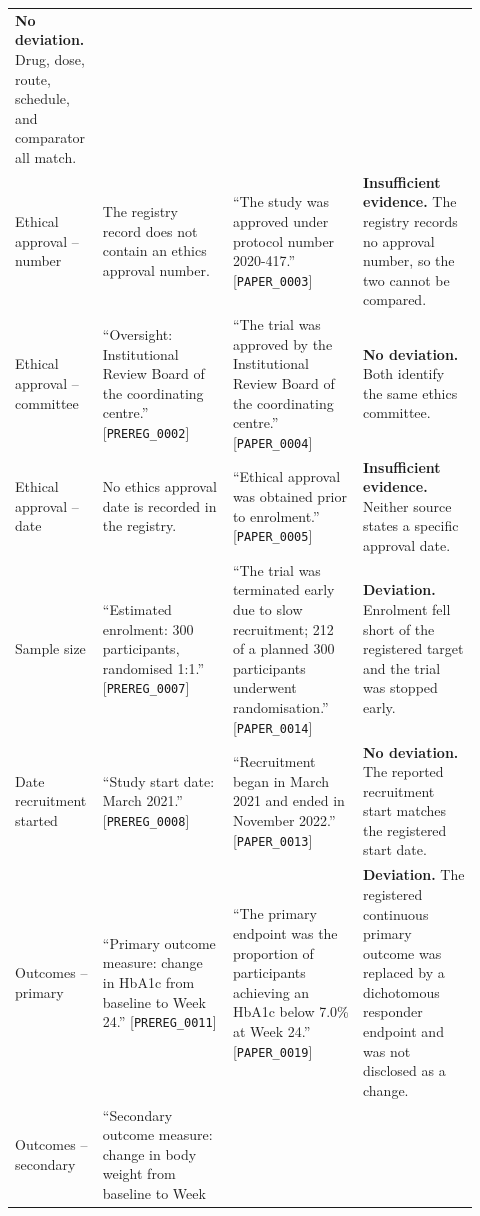 \documentclass{article}
\begin{document}
\begin{table}[h]
\begin{tabular}{@{}p{0.14\linewidth}p{0.27\linewidth}p{0.27\linewidth}p{0.24\linewidth}@{}}
    \textbf{No deviation.} Drug, dose, route, schedule, and comparator all
    match. \\
    \addlinespace[3pt]
    Ethical approval -- number &
    The registry record does not contain an ethics approval number. &
    ``The study was approved under protocol number 2020-417.''
    [\texttt{PAPER\_0003}] &
    \textbf{Insufficient evidence.} The registry records no approval number, so
    the two cannot be compared. \\
    \addlinespace[3pt]
    Ethical approval -- committee &
    ``Oversight: Institutional Review Board of the coordinating centre.''
    [\texttt{PREREG\_0002}] &
    ``The trial was approved by the Institutional Review Board of the
    coordinating centre.'' [\texttt{PAPER\_0004}] &
    \textbf{No deviation.} Both identify the same ethics committee. \\
    \addlinespace[3pt]
    Ethical approval -- date &
    No ethics approval date is recorded in the registry. &
    ``Ethical approval was obtained prior to enrolment.''
    [\texttt{PAPER\_0005}] &
    \textbf{Insufficient evidence.} Neither source states a specific approval
    date. \\
    \addlinespace[3pt]
    Sample size &
    ``Estimated enrolment: 300 participants, randomised 1:1.''
    [\texttt{PREREG\_0007}] &
    ``The trial was terminated early due to slow recruitment; 212 of a planned
    300 participants underwent randomisation.'' [\texttt{PAPER\_0014}] &
    \textbf{Deviation.} Enrolment fell short of the registered target and the
    trial was stopped early. \\
    \addlinespace[3pt]
    Date recruitment started &
    ``Study start date: March 2021.'' [\texttt{PREREG\_0008}] &
    ``Recruitment began in March 2021 and ended in November 2022.''
    [\texttt{PAPER\_0013}] &
    \textbf{No deviation.} The reported recruitment start matches the
    registered start date. \\
    \addlinespace[3pt]
    Outcomes -- primary &
    ``Primary outcome measure: change in HbA1c from baseline to Week 24.''
    [\texttt{PREREG\_0011}] &
    ``The primary endpoint was the proportion of participants achieving an
    HbA1c below 7.0\% at Week 24.'' [\texttt{PAPER\_0019}] &
    \textbf{Deviation.} The registered continuous primary outcome was replaced
    by a dichotomous responder endpoint and was not disclosed as a change. \\
    \addlinespace[3pt]
    Outcomes -- secondary &
    ``Secondary outcome measure: change in body weight from baseline to Week

\end{tabular}
\end{table}
\end{document}
